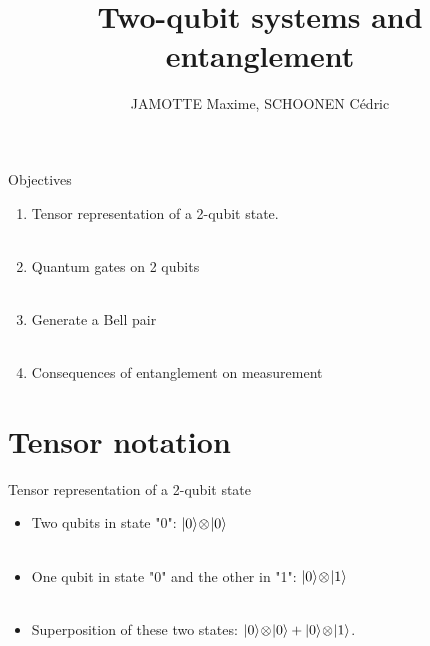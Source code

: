\documentclass[aspectratio=169,12pt]{beamer}
\title{Two-qubit systems and entanglement}
\author{JAMOTTE Maxime, SCHOONEN Cédric}
\institute{Digital Learning Hub}
\date{}
\begin{document}
\begin{frame}
  \titlepage
\end{frame}



\begin{frame}{Objectives}
  \begin{enumerate}[<+->]
    \item Tensor representation of a 2-qubit state.
    \\~\\
    \item Quantum gates on 2 qubits
    \\~\\
    \item Generate a Bell pair
    \\~\\
    \item Consequences of entanglement on measurement
  \end{enumerate}
\end{frame}

\section{Tensor notation}

\begin{frame}{Tensor representation of a 2-qubit state}
  \begin{itemize}[<+->]
    \item Two qubits in state "0": $\ket{0}\!\otimes\!\ket{0}$
    \\~\\
    \item One qubit in state "0" and the other in "1": $\ket{0}\!\otimes\!\ket{1}$
    \\~\\
    \item Superposition of these two states: $\ket{0}\!\otimes\!\ket{0} + \ket{0}\!\otimes\!\ket{1}$.
  \end{itemize}
\end{frame}
\end{document}
